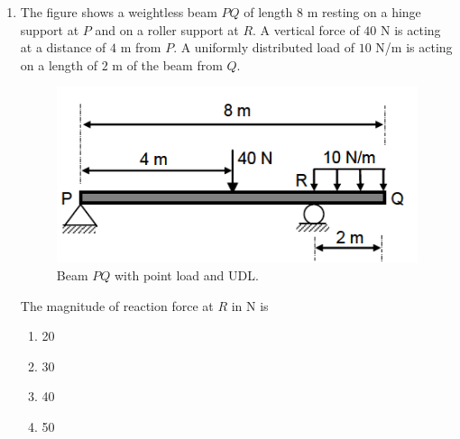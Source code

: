\documentclass[journal]{IEEEtran}
\begin{document}
\begin{enumerate}[leftmargin=0pt]
\item The figure shows a weightless beam $PQ$ of length $8$ m resting on a hinge support at $P$ and on a roller support at $R$. A vertical force of $40$ N is acting at a distance of $4$ m from $P$. A uniformly distributed load of $10$ N/m is acting on a length of $2$ m of the beam from $Q$.
\begin{figure}[H]
\centering
\includegraphics[width=0.6\linewidth]{figs/load.png}
\caption{Beam $PQ$ with point load and UDL.}
\end{figure}
The magnitude of reaction force at $R$ in N is
\begin{multicols}{2}
\begin{enumerate}[label=(\Alph*),itemsep=0pt,topsep=2pt]
  \item 20
  \item 30
  \item 40
  \item 50
\end{enumerate}
\end{multicols}
\hfill{}


\end{enumerate}
\end{document}

